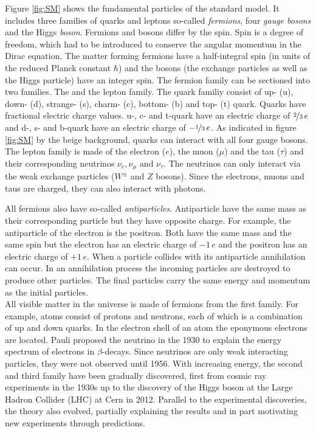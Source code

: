 \documentclass[a4paper,11pt,twosided,final,german,openbib,pdftex,listof=totoc,bibliography=totoc]{scrbook}
\begin{document}
Figure \ref{fig:SM} shows the fundamental particles of the standard model. It includes three families of quarks and leptons so-called \textit{fermions}, four \textit{gauge bosons} and the Higgs \textit{boson}. Fermions and bosons differ by the spin. Spin is a degree of freedom, which had to be introduced to conserve the angular momentum in the Dirac equation. The matter forming fermions have a half-integral spin (in units of the reduced Planck constant $\hbar$) and the bosons (the exchange particles as well as the Higgs particle) have an integer spin. The fermion family can be sectioned into two families. The  and the lepton family. 
The quark familiy consist of up- (u), down- (d), strange- (s), charm- (c), bottom- (b) and top- (t) quark. Quarks have fractional electric charge values. u-, c- and t-quark have an electric charge of $\nicefrac{2}{3} \,e$ and d-, s- and b-quark have an electric charge of $-\nicefrac{1}{3} \,e$. As indicated in figure \ref{fig:SM} by the beige background, quarks can interact with all four gauge bosons.
The lepton family is made of the electron ($e$), the muon ($\mu$) and the tau ($\tau$) and their corresponding neutrinos $\nu_e,\nu_{\mu} \textrm{ and } \nu_{\tau}$. The neutrinos can only interact via the weak exchange particles ($W^{\pm}$ and $Z$ bosons). Since the electrons, muons and taus are charged, they can also interact with photons.

All fermions also have so-called \textit{antiparticles}. Antiparticle have the same mass as their corresponding particle but they have opposite charge. For example, the antiparticle of the electron is the positron. Both have the same mass and the same spin but the electron has an electric charge of $-1\,e$ and the positron has an electric charge of $+1\,e$. When a particle collides with its antiparticle annihilation can occur. In an annihilation process the incoming particles are destroyed to produce other particles. The final particles carry the same energy and momentum as the initial particles.\\


All visible matter in the universe is made of fermions from the first family. For example, atoms consist of protons and neutrons, each of which is a combination of up and down quarks. In the electron shell of an atom the eponymous electrons are located. Pauli proposed the neutrino in the 1930 to explain the energy spectrum of electrons in $\beta$-decays. Since neutrinos are only weak interacting particles, they were not observed until 1956.\cite{REINES19941} With increasing energy, the second and third family have been gradually discovered, first from cosmic ray experiments in the 1930s up to the discovery of the Higgs boson at the Large Hadron Collider (LHC) at Cern in 2012. Parallel to the experimental discoveries, the theory also evolved, partially explaining the results and in part motivating new experiments through predictions.
\end{document}
